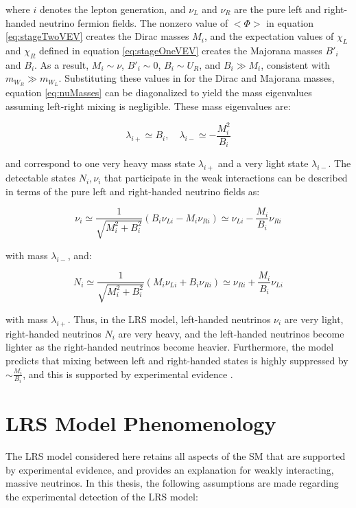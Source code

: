 where $i$ denotes the lepton generation, and $\nu_{L}$ and $\nu_{R}$ are the pure left and right-handed 
neutrino fermion fields.  The nonzero value of $<\Phi>$ in equation \ref{eq:stageTwoVEV} creates the 
Dirac masses $M_{i}$, and the expectation values of $\chi_{L}$ and $\chi_{R}$ defined in equation \ref{eq:stageOneVEV} 
creates the Majorana masses $B'_{i}$ and $B_{i}$.  As a result, $M_{i} \sim \nu$, $B'_{i} \sim 0$, 
$B_{i} \sim U_{R}$, and $B_{i} \gg M_{i}$, consistent with $m_{W_{R}} \gg m_{W_{L}}$.  Substituting 
these values in for the Dirac and Majorana masses, equation \ref{eq:nuMasses} can be diagonalized to 
yield the mass eigenvalues assuming left-right mixing is negligible.  These mass eigenvalues are:

\begin{equation}
	\lambda_{i+} \simeq B_{i},  \quad \lambda_{i-} \simeq -\frac{M^{2}_{i}}{B_{i}}
\end{equation}

and correspond to one very heavy mass state $\lambda_{i+}$ and a very light state $\lambda_{i-}$.  The 
detectable states $N_{i}, \nu_{i}$ that participate in the weak interactions can be described in terms of 
the pure left and right-handed neutrino fields as:

\begin{equation}
	\nu_{i} \simeq \frac{1}{\sqrt{M^{2}_{i} + B^{2}_{i}}}(B_{i}\nu_{Li} - M_{i}\nu_{Ri}) \simeq \nu_{Li} - \frac{M_{i}}{B_{i}}\nu_{Ri}
\end{equation}

with mass $\lambda_{i-}$, and:

\begin{equation}
	N_{i} \simeq \frac{1}{\sqrt{M^{2}_{i} + B^{2}_{i}}}(M_{i}\nu_{Li} + B_{i}\nu_{Ri}) \simeq \nu_{Ri} + \frac{M_{i}}{B_{i}}\nu_{Li}
\end{equation}

with mass $\lambda_{i+}$.  Thus, in the LRS model, left-handed neutrinos $\nu_{i}$ are very light,  
right-handed neutrinos $N_{i}$ are very heavy, and the left-handed neutrinos become lighter as 
the right-handed neutrinos become heavier.  Furthermore, the model predicts that mixing between left 
and right-handed states is highly suppressed by $\sim \frac{M_{i}}{B_{i}}$, and this is supported by 
experimental evidence \cite{dZeroMixingLimits,theoreticalMixingLimits}.


\section{LRS Model Phenomenology}
\label{sec:lrsPhenomenology}
The LRS model considered here retains all aspects of the SM that are supported by experimental 
evidence, and provides an explanation for weakly interacting, massive neutrinos.  In this thesis, the 
following assumptions are made regarding the experimental detection of the LRS model:

